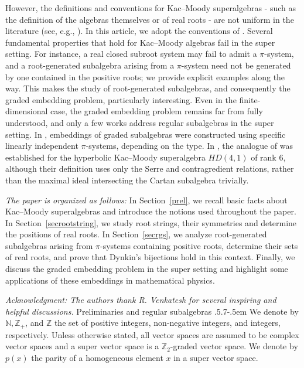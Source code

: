 \documentclass[11pt,reqno]{amsart}
\makeatletter
\theoremstyle{plain}
\theoremstyle{definition}
\theoremstyle{remark}
\numberwithin{equation}{section}
\def\section{\def\@secnumfont{\mdseries}\@startsection{section}{1}%
  \z@{.7\linespacing\@plus\linespacing}{.5\linespacing}%
  {\normalfont\scshape\centering}}
\def\subsection{\def\@secnumfont{\bfseries}\@startsection{subsection}{2}%
  {\parindent}{.5\linespacing\@plus.7\linespacing}{-.5em}%
  {\normalfont\bfseries}}
\makeatother
\begin{document}
 However, the definitions and conventions for Kac–Moody superalgebras - such as the definition of the algebras themselves or of real roots - are not uniform in the literature (see, e.g., \cite{gorelik2024rootgroupoid,Serganova11KacMoody,Wa01}). In this article, we adopt the conventions of \cite{Serganova11KacMoody}. Several fundamental properties that hold for Kac–Moody algebras fail in the super setting. For instance, a real closed subroot system may fail to admit a $\pi$-system, and a root-generated subalgebra arising from a $\pi$-system need not be generated by one contained in the positive roots; we provide explicit examples along the way. This makes the study of root-generated subalgebras, and consequently the graded embedding problem, particularly interesting.
Even in the finite-dimensional case, the graded embedding problem remains far from fully understood, and only a few works address regular subalgebras in the super setting. In \cite{vander87regular}, embeddings of graded subalgebras were constructed using specific linearly independent $\pi$-systems, depending on the type. In \cite{Nayak13Embedding}, the analogue of \cite{viswanath08embedding} was established for the hyperbolic Kac–Moody superalgebra $HD(4,1)$ of rank $6$, although their definition uses only the Serre and contragredient relations, rather than the maximal ideal intersecting the Cartan subalgebra trivially.

\noindent\textit{The paper is organized as follows:} In Section~\ref{prel}, we recall basic facts about Kac–Moody superalgebras and introduce the notions used throughout the paper. In Section~\ref{secrootstring}, we study root strings, their symmetries and determine the positions of real roots. In Section~\ref{secrgs}, we analyze root-generated subalgebras arising from $\pi$-systems containing positive roots, determine their sets of real roots, and prove that Dynkin’s bijections hold in this context. Finally, we discuss the graded embedding problem in the super setting and highlight some applications of these embeddings in mathematical physics.

\textit{Acknowledgment: The authors thank R. Venkatesh for several inspiring and helpful discussions. } 
\section{Preliminaries and regular subalgebras}\label{prel}
\subsection{}
We denote by $\mathbb{N}, \mathbb{Z}_{+}$, and $\mathbb{Z}$ the set of positive integers, non-negative integers, and integers, respectively. Unless otherwise stated, all vector spaces are assumed to be complex vector spaces and a super vector space is a $\mathbb{Z}_2$-graded vector space. We denote by $p(x)$ the parity of a homogeneous element $x$ in a super vector space.
\end{document}
